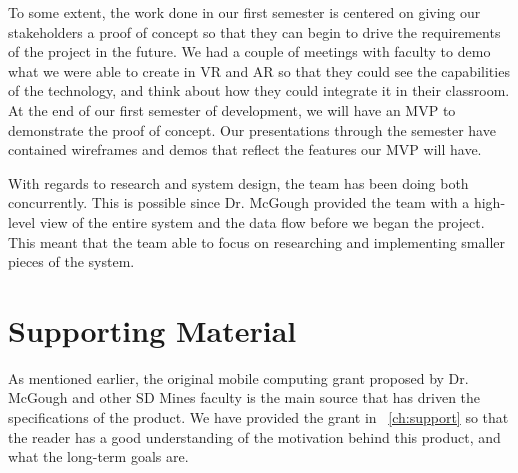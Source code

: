 To some extent, the work done in our first semester is centered on giving our 
stakeholders a proof of concept so that they can begin to drive the requirements
of the project in the future. We had a couple of meetings with faculty to demo 
what we were able to create in VR and AR so that they could see the capabilities
of the technology, and think about how they could integrate it in their 
classroom. At the end of our first semester of development, we will have an MVP
to demonstrate the proof of concept. Our presentations through the semester have 
contained wireframes and demos that reflect the features our MVP will have.

With regards to research and system design, the team has been doing both
concurrently. This is possible since Dr. McGough provided the team with a 
high-level view of the entire system and the data flow before we began the 
project. This meant that the team able to focus on researching and implementing 
smaller pieces of the system. 


\section{Supporting Material}


As mentioned earlier, the original mobile computing grant proposed by Dr. 
McGough and other SD Mines faculty is the main source that has driven the
specifications of the product. We have provided the grant in 
~\autoref{ch:support} so that the reader has a good understanding of the
motivation behind this product, and what the long-term goals are.

